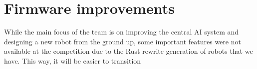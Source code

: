 \section{Firmware improvements}
While the main focus of the team is on improving the
central AI system and designing a new robot from the ground up,
some important features were not available at the competition
due to the Rust rewrite
generation of robots that we have. This way, it will be easier
to transition 




